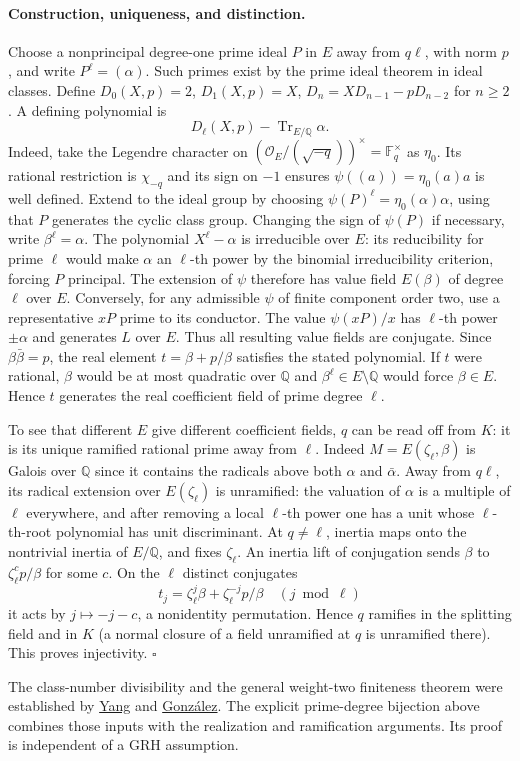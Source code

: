 \paragraph{Construction, uniqueness, and distinction.}
Choose a nonprincipal degree-one prime ideal $P$ in $E$ away from $q\ell$, with norm $p$, and write $P^\ell=(\alpha)$. Such primes exist by the prime ideal theorem in ideal classes. Define $D_0(X,p)=2$, $D_1(X,p)=X$, $D_n=XD_{n-1}-pD_{n-2}$ for $n\ge2$. A defining polynomial is
\[
                     D_\ell(X,p)-\operatorname{Tr}_{E/\mathbb Q}\alpha.
\]
Indeed, take the Legendre character on $(\mathcal O_E/(\sqrt{-q}))^\times=\mathbb F_q^\times$ as $\eta_0$. Its rational restriction is $\chi_{-q}$ and its sign on $-1$ ensures $\psi((a))=\eta_0(a)a$ is well defined. Extend to the ideal group by choosing $\psi(P)^\ell=\eta_0(\alpha)\alpha$, using that $P$ generates the cyclic class group. Changing the sign of $\psi(P)$ if necessary, write $\beta^\ell=\alpha$. The polynomial $X^\ell-\alpha$ is irreducible over $E$: its reducibility for prime $\ell$ would make $\alpha$ an $\ell$-th power by the binomial irreducibility criterion, forcing $P$ principal. The extension of $\psi$ therefore has value field $E(\beta)$ of degree $\ell$ over $E$. Conversely, for any admissible $\psi$ of finite component order two, use a representative $xP$ prime to its conductor. The value $\psi(xP)/x$ has $\ell$-th power $\pm\alpha$ and generates $L$ over $E$. Thus all resulting value fields are conjugate. Since $\beta\bar\beta=p$, the real element $t=\beta+p/\beta$ satisfies the stated polynomial. If $t$ were rational, $\beta$ would be at most quadratic over $\mathbb Q$ and $\beta^\ell\in E\setminus\mathbb Q$ would force $\beta\in E$. Hence $t$ generates the real coefficient field of prime degree $\ell$.

To see that different $E$ give different coefficient fields, $q$ can be read off from $K$: it is its unique ramified rational prime away from $\ell$. Indeed $M=E(\zeta_\ell,\beta)$ is Galois over $\mathbb Q$ since it contains the radicals above both $\alpha$ and $\bar\alpha$. Away from $q\ell$, its radical extension over $E(\zeta_\ell)$ is unramified: the valuation of $\alpha$ is a multiple of $\ell$ everywhere, and after removing a local $\ell$-th power one has a unit whose $\ell$-th-root polynomial has unit discriminant. At $q\ne\ell$, inertia maps onto the nontrivial inertia of $E/\mathbb Q$, and fixes $\zeta_\ell$. An inertia lift of conjugation sends $\beta$ to $\zeta_\ell^c p/\beta$ for some $c$. On the $\ell$ distinct conjugates
\[
                 t_j=\zeta_\ell^j\beta+\zeta_\ell^{-j}p/\beta
                 \quad(j\bmod\ell)
\]
it acts by $j\mapsto-j-c$, a nonidentity permutation. Hence $q$ ramifies in the splitting field and in $K$ (a normal closure of a field unramified at $q$ is unramified there). This proves injectivity. \hfill$\square$

The class-number divisibility and the general weight-two finiteness theorem were established by \href{https://arxiv.org/abs/math/0301306}{Yang} and \href{https://ems.press/content/serial-article-files/38349}{Gonz\'alez}. The explicit prime-degree bijection above combines those inputs with the realization and ramification arguments. Its proof is independent of a GRH assumption.
